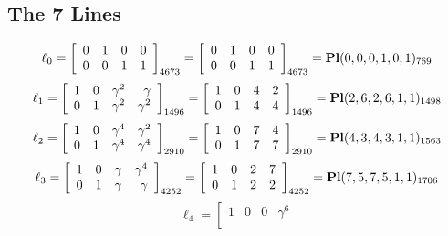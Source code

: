 \documentclass{article}
\begin{document}
{\subsection*{The 7 Lines}
$$
\ell_{0} = 
\left[
\begin{array}{*{4}{r}}
0 & 1 & 0 & 0\\
0 & 0 & 1 & 1\\
\end{array}
\right]
_{4673}
=
\left[
\begin{array}{*{4}c}
0  & 1  & 0  & 0\\
0  & 0  & 1  & 1\\
\end{array}
\right]_{4673}
={\rm\bf Pl}(0,0,0,1,0,1 )_{769}$$
$$
\ell_{1} = 
\left[
\begin{array}{*{4}{r}}
1 & 0 & \gamma^{2} & \gamma \\
0 & 1 & \gamma^{2} & \gamma^{2}\\
\end{array}
\right]
_{1496}
=
\left[
\begin{array}{*{4}c}
1  & 0  & 4  & 2\\
0  & 1  & 4  & 4\\
\end{array}
\right]_{1496}
={\rm\bf Pl}(2,6,2,6,1,1 )_{1498}$$
$$
\ell_{2} = 
\left[
\begin{array}{*{4}{r}}
1 & 0 & \gamma^{4} & \gamma^{2}\\
0 & 1 & \gamma^{4} & \gamma^{4}\\
\end{array}
\right]
_{2910}
=
\left[
\begin{array}{*{4}c}
1  & 0  & 7  & 4\\
0  & 1  & 7  & 7\\
\end{array}
\right]_{2910}
={\rm\bf Pl}(4,3,4,3,1,1 )_{1563}$$
$$
\ell_{3} = 
\left[
\begin{array}{*{4}{r}}
1 & 0 & \gamma  & \gamma^{4}\\
0 & 1 & \gamma  & \gamma \\
\end{array}
\right]
_{4252}
=
\left[
\begin{array}{*{4}c}
1  & 0  & 2  & 7\\
0  & 1  & 2  & 2\\
\end{array}
\right]_{4252}
={\rm\bf Pl}(7,5,7,5,1,1 )_{1706}$$
$$
\ell_{4} = 
\left[
\begin{array}{*{4}{r}}
1 & 0 & 0 & \gamma^{6}\\

\end{array}$$}
\end{document}
